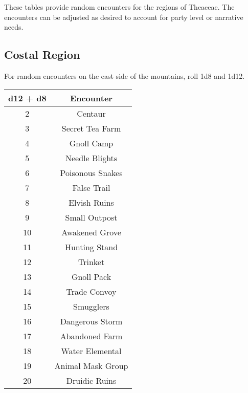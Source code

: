 These tables provide random encounters for the regions of Theaceae. The encounters can be adjusted as desired to account for party level or narrative needs.

\subsection{Costal Region}

For random encounters on the east side of the mountains, roll 1d8 and 1d12.

\begin{tabular}{|c|c|}

\hline

\textbf{d12 + d8} & \textbf{Encounter}\\

\hline

2 & Centaur\\

3 & Secret Tea Farm\\

4 & Gnoll Camp\\

5 & Needle Blights\\

6 & Poisonous Snakes\\

7 & False Trail\\

8 & Elvish Ruins\\

9 & Small Outpost\\

10 & Awakened Grove\\

11 & Hunting Stand\\

12 & Trinket\\

13 & Gnoll Pack\\

14 & Trade Convoy\\

15 & Smugglers\\

16 & Dangerous Storm\\

17 & Abandoned Farm\\

18 & Water Elemental\\

19 & Animal Mask Group\\

20 & Druidic Ruins\\

\hline

\end{tabular}

